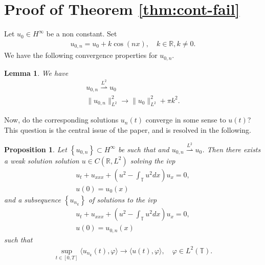 \documentclass[12pt,reqno]{amsart}
\numberwithin{equation}{section}  %
\newcommand{\rr}{\mathbb{R}}
\newcommand{\ci}{\mathbb{T}}
\newcommand{\vp}{\varphi}
\newtheorem{lemma}[theorem]{Lemma}
\newtheorem{proposition}[theorem]{Proposition}
\begin{document}
\section{Proof of Theorem \ref{thm:cont-fail}}
\label{sec:pf-thm}
Let $u_{0} \in H^{\infty}$ be a non constant. Set
%
%
\begin{equation}
  \label{ill-pos-init-data}
\begin{split}
  u_{0,n} = u_{0} + k \cos(nx), \quad k\in \rr, k \neq 0.
\end{split}
\end{equation}
%
We have the following convergence properties for $u_{0,n}$. 
%
%
%
%
%
%
%                
%
%
%
%
\begin{lemma}
We have
%
%
\begin{gather}
  u_{0,n}\overset{L^{2}}{\rightharpoonup} u_{0}
  \\
  \| u_{0,n} \|_{L^{2}}^{2} \to \| u_{0} \|_{L^{2}}^{2} + \pi k^{2}.
\end{gather}
\label{lem:conv-prop-init}
\end{lemma}
%
%
%
%
Now, do the corresponding solutions $u_{n}(t)$ converge in some sense to
$u(t)$? This question is
the central issue of the paper, and is resolved in the following.
%
%
%
%
%
%
%
%
\begin{proposition}
  Let $\left\{ u_{0,n} \right\} \subset
  H^{\infty}$ be such that and $u_{0,n} \overset{L^{2}}{\rightharpoonup} u_{0}$.
  Then there exists a weak solution solution $u \in C(\rr,
  L^{2})$ solving the ivp
  \begin{gather}
    \label{n-mkdv}
    u_{t} + u_{xxx} + \left( u^{2} - \int_{\ci} u^{2} dx \right)u_{x} = 0,
    \\
    u(0) = u_{0}(x)
    \label{n-mkdv-init}
  \end{gather}
  and a subsequence $\left\{ u_{n_{k}} \right\}$ of solutions to the ivp
  \begin{gather}
    u_{t} + u_{xxx} + \left( u^{2} - \int_{\ci} u^{2} dx \right)u_{x} = 0,
    \\
    u(0) = u_{0,n}(x)
  \end{gather}
%
%
  such that
  \begin{equation*}
  \begin{split}
    \sup_{t \in [0, T]} \langle u_{n_{k}}(t), \vp \rangle \to \langle
    u(t), \vp
    \rangle, \quad \vp \in L^{2}(\ci).
  \end{split}
  \end{equation*}
\label{prop:key-paper}
\end{proposition}
\end{document}

